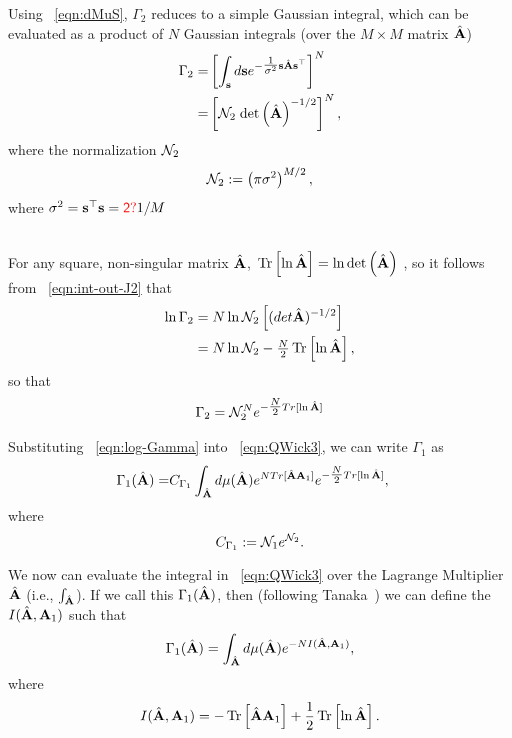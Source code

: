 Using \EQN~\ref{eqn:dMuS}, 
$\Gamma_2$ reduces to a simple Gaussian integral, which can be evaluated as a product of $N$ Gaussian integrals (over the $M\times M$ matrix $\hat{\mathbf{A}}$)
\begin{align}
\label{eqn:int-out-J2}
\Gamma_2 
   =& \left[\int_{{\mathbf{s}}} d\mathbf{s}e^{-\tfrac{1}{\sigma^{2}} \mathbf{s}\hat{\mathbf{A}}\mathbf{s}^{\top} }\right]^{N} \\
   =& \left[\mathcal{N}_{2}\;\mbox{}{\text{det}}\left(\hat{\mathbf{A}}\right)^{-1/2}\right]^{N}  ,
\end{align}
where the normalization $\mathcal{N}_2$
\begin{align}
\label{eqn:norm_2}
\mathcal{N}_2 := \left(\pi\sigma^{2}\right)^{M/2}  ,
\end{align}
where $\sigma^{2}=\mathbf{s}^{\top}\mathbf{s}={\color{red}\sf{2?}}1/M$

\\
For any square, non-singular matrix $\hat{\mathbf{A}}$,  $ \mbox{}\operatorname{Tr}\left[\ln\hat{\mathbf{A}}\right]=\ln \mbox{}{\text{det}}\left(\hat{\mathbf{A}}\right)$ , so
it follows from \EQN~\ref{eqn:int-out-J2} that
\begin{align}
\nonumber
\ln\Gamma_2 
   &=N\ln\NORM_2\left[( det \AHAT)^{-1/2} \right]  \\  \nonumber %
&= N\ln\NORM_2 -\tfrac{N}{2}\Trace{ \ln\AHAT }  ,
\end{align}
so that
\begin{align}
\label{eqn:log-Gamma}
\Gamma_2 = \mathcal{N}_{2}^{N} e^{ -\tfrac{N}{2} Tr[ \ln\hat{\mathbf{A}} ] } 
\end{align}

Substituting
\EQN~\ref{eqn:log-Gamma}
into \EQN~\ref{eqn:QWick3},
we can write $\Gamma_1$ as
\begin{eqnarray}
  \label{eqn:gamma1}
\Gamma_1(\hat{\mathbf{A}})  =& C_{\Gamma_1}\int_{\hat{\mathbf{A}}} d\mu(\hat{\mathbf{A}})   e^{ N Tr[ \hat{\mathbf{A}}\mathbf{A}_{1} ] }  e^{ -\tfrac{N}{2} Tr[ \ln\hat{\mathbf{A}} ] }  ,
\end{eqnarray}
where
\begin{equation}
    C_{\Gamma_1}:=\mathcal{N}_1 e^{\mathcal{N}_2}  .
\end{equation}

We now can evaluate the integral in \EQN~\ref{eqn:QWick3} over the Lagrange Multiplier $\hat{\mathbf{A}}$ (i.e., $\int_{\hat{\mathbf{A}}} $). 
If we call this $\Gamma_1(\hat{\mathbf{A}})$,
then (following Tanaka~\cite{Tanaka2008}) we can define the \emph{\RateFunction} $I(\hat{\mathbf{A}},\mathbf{A}_{1})$ such that
\begin{align}
\label{eqn:LambdaA}
\Gamma_1(\hat{\mathbf{A}})=\int_{\hat{\mathbf{A}}}  d\mu(\hat{\mathbf{A}}) e^{-NI(\hat{\mathbf{A}},\mathbf{A}_{1})}  ,
\end{align}
where
\begin{align}
\label{eqn:IAA}
I(\hat{\mathbf{A}},\mathbf{A}_{1}) = -\mbox{}\operatorname{Tr}\left[ \hat{\mathbf{A}}\mathbf{A}_{1}\right] + \frac{1}{2}\mbox{}\operatorname{Tr}\left[ \ln\hat{\mathbf{A}} \right]  .
\end{align}


